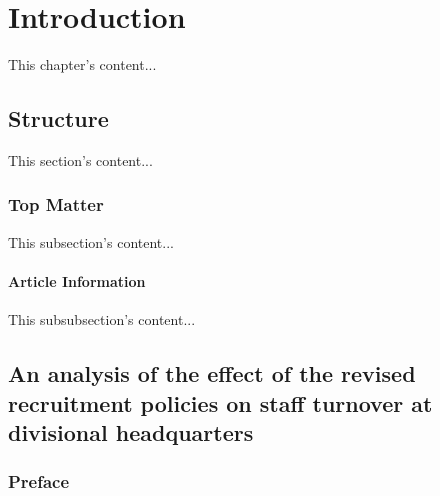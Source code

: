 \documentclass{book}
\begin{document}
\setcounter{secnumdepth}{1}

\chapter{Introduction}
This chapter's content...

\section{Structure}
This section's content...

\subsection{Top Matter}
This subsection's content...

\subsubsection{Article Information}
This subsubsection's content...

\section[Effect on staff turnover]{An analysis of the
effect of the revised recruitment policies on staff
turnover at divisional headquarters}

\subsection*{Preface}
\end{document}
